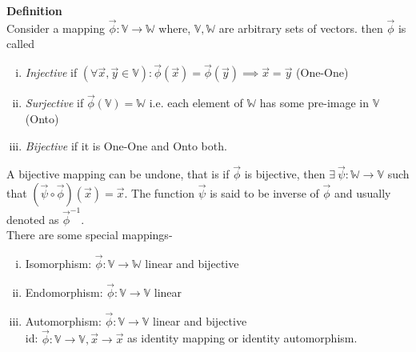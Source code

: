 \documentclass{article}
\begin{document}
\textbf{Definition}\\
Consider a mapping $\vec{\phi} \colon \mathbb{V} \longrightarrow \mathbb{W}$ where, $\mathbb{V},\mathbb{W}$ are arbitrary sets of vectors. then $\vec{\phi}$ is called\\
\begin{enumerate}[i.]
    \item \textit{Injective} if $(\forall \Vec{x},\Vec{y} \in \mathbb{V})\colon \vec{\phi}(\Vec{x})= \vec{\phi}(\Vec{y})\implies \Vec{x} = \Vec{y}$   (One-One)
    \item \textit{Surjective} if $\vec{\phi}(\mathbb{V}) = \mathbb{W}$ i.e. each element of $\mathbb{W}$ has some pre-image in $\mathbb{V}$     (Onto)
    \item \textit{Bijective} if it is One-One and Onto both.
\end{enumerate}

A bijective mapping can be undone, that is if $\vec{\phi}$ is bijective, then $\exists~\vec{\psi}\colon \mathbb{W}\longrightarrow\mathbb{V}$ such that $(\vec{\psi} \circ \vec{\phi})(\Vec{x}) = \vec{x}$. The function $\vec{\psi}$ is said to be inverse of $\vec{\phi}$ and usually denoted as $\vec{\phi}^{-1}$.\\

There are some special mappings-
\begin{enumerate}[i.]
    \item Isomorphism: $\vec{\phi}\colon\mathbb{V}\longrightarrow\mathbb{W}$  linear and bijective
    \item Endomorphism: $\vec{\phi}\colon\mathbb{V}\longrightarrow\mathbb{V}$  linear
    \item Automorphism: $\vec{\phi}\colon\mathbb{V}\longrightarrow\mathbb{V}$  linear and bijective\\
    id: $\vec{\phi}\colon\mathbb{V}\longrightarrow\mathbb{V}, \Vec{x}\longrightarrow\Vec{x}$ as identity mapping or identity automorphism. 
\end{enumerate}
\end{document}
